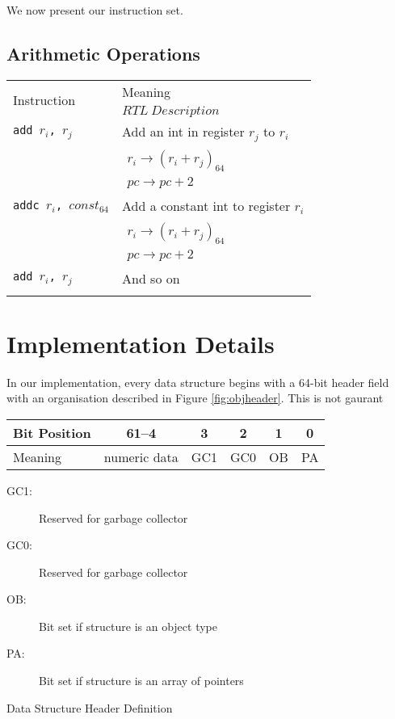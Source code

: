 		We now present our instruction set.
		
		\subsection{Arithmetic Operations}
		
		\begin{tabular}{|l|l|}
			\hline
			\multirow{2}{*}{Instruction} & Meaning \\
			& $RTL~Description$ \\
			\hline
			\texttt{add $r_i$, $r_j$} & Add an int in register $r_j$ to $r_i$ \\
			& $\begin{array}{lcl} 
			r_i \rightarrow (r_i + r_j)_{64} \\
			pc \rightarrow pc + 2  
			\end{array}$ \\
			\hline 
			\texttt{addc $r_i$, $const_{64}$} & Add a constant int to register $r_i$ \\
			& $\begin{array}{lcl} 
			r_i \rightarrow (r_i + r_j)_{64} \\
			pc \rightarrow pc + 2  
			\end{array}$ \\
			\hline 
			\texttt{add $r_i$, $r_j$} & And so on  \\
			& \todo{Finish this} \\
			\hline  
		\end{tabular}
		
	
	\section{Implementation Details}
		
		In our implementation, every data structure begins with a 64-bit header field with an organisation described in Figure \ref{fig:objheader}. This is not gaurant
		
		\begin{myfigure}
			\begin{tabular}{|l|c| c| c|c|c|}
				\hline
				Bit Position & 61--4 & 3 & 2 & 1 & 0 \\
				\hline
				Meaning & numeric data & GC1 & GC0 & OB & PA \\
				\hline
			\end{tabular}
			\newline
			\begin{description}
				\item[GC1:] Reserved for garbage collector
				\item[GC0:] Reserved for garbage collector
				\item[OB:] Bit set if structure is an object type
				\item[PA:] Bit set if structure is an array of pointers
			\end{description}
			
			\caption{Data Structure Header Definition}
			\label{fig:objheader}
		\end{myfigure}
		
